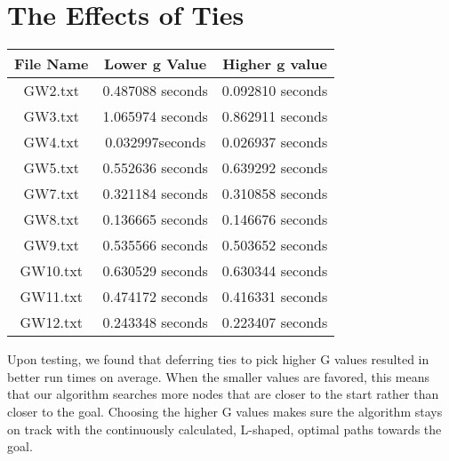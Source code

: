 \documentclass{article}
\begin{document}
\section{The Effects of Ties}

\begin{center}
 \begin{tabular}{||c c c||} 
 \hline
 File Name & Lower g Value & Higher g value \\ [0.5ex] 
 \hline\hline
 GW2.txt & 0.487088 seconds & 0.092810 seconds \\ 
 \hline
 GW3.txt & 1.065974 seconds & 0.862911 seconds\\
 \hline
 GW4.txt & 0.032997seconds & 0.026937 seconds\\
 \hline
 GW5.txt & 0.552636 seconds & 0.639292 seconds\\
 \hline
 GW7.txt & 0.321184 seconds & 0.310858 seconds\\
 \hline
 GW8.txt & 0.136665 seconds & 0.146676 seconds\\
 \hline
 GW9.txt & 0.535566 seconds & 0.503652 seconds\\
 \hline
 GW10.txt &0.630529 seconds & 0.630344 seconds\\
 \hline
 GW11.txt & 0.474172 seconds & 0.416331 seconds\\
 \hline
 GW12.txt & 0.243348 seconds & 0.223407 seconds\\
 \hline
\end{tabular}
\end{center}

Upon testing, we found that deferring ties to pick higher G values resulted in better run times on average. When the smaller values are favored, this means that our algorithm searches more nodes that are closer to the start rather than closer to the goal. Choosing the higher G values makes sure the algorithm stays on track with the continuously calculated, L-shaped, optimal paths towards the goal.
\end{document}
